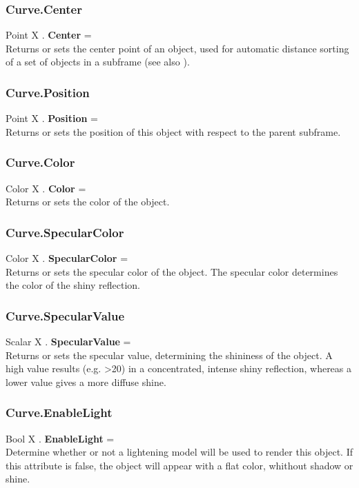 \subsubsection{Curve.Center \label{F:Curve:Center}}
Point X . \textbf{Center} = \\
Returns or sets the center point of an object, used for automatic distance sorting of a set of objects in a subframe (see also ).

\subsubsection{Curve.Position \label{F:Curve:Position}}
Point X . \textbf{Position} = \\
Returns or sets the position of this object with respect to the parent subframe.

\subsubsection{Curve.Color \label{F:Curve:Color}}
Color X . \textbf{Color} = \\
Returns or sets the color of the object.

\subsubsection{Curve.SpecularColor \label{F:Curve:SpecularColor}}
Color X . \textbf{SpecularColor} = \\
Returns or sets the specular color of the object. The specular color determines the color of the shiny reflection.

\subsubsection{Curve.SpecularValue \label{F:Curve:SpecularValue}}
Scalar X . \textbf{SpecularValue} = \\
Returns or sets the specular value, determining the shininess of the object. A high value results (e.g. >20) in a concentrated, intense shiny reflection, whereas a lower value gives a more diffuse shine.

\subsubsection{Curve.EnableLight \label{F:Curve:EnableLight}}
Bool X . \textbf{EnableLight} = \\
Determine whether or not a lightening model will be used to render this object. If this attribute is false, the object will appear with a flat color, whithout shadow or shine.

